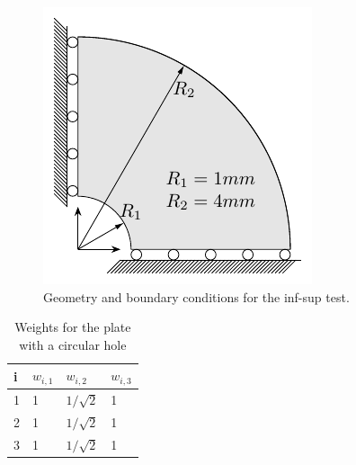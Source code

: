 \documentclass{article}
\begin{document}
\begin{figure}[htb!]
	\centering
	\includegraphics[width=0.5\linewidth]{annular}
	\caption{Geometry and boundary conditions for the inf-sup test.}
	\label{fig:quarter_annulus}
\end{figure}

\begin{table}
\begin{center}
\caption{Weights for the plate with a circular hole}\label{table:weights}
\begin{tabular}{l@{\hskip 1cm}l@{\hskip 1cm}l@{\hskip 1cm}l}
\hline
i    & $w_{i,1} $ & $w_{i,2}$ & $w_{i,3}$\\
\hline
1    & 1    & ${1}/{\sqrt{2}}$ & 1 \\
2    & 1    & ${1}/{\sqrt{2}}$ & 1 \\
3    & 1    & ${1}/{\sqrt{2}}$ & 1 \\
\hline
\end{tabular}
\end{center}
\end{table}
\end{document}
